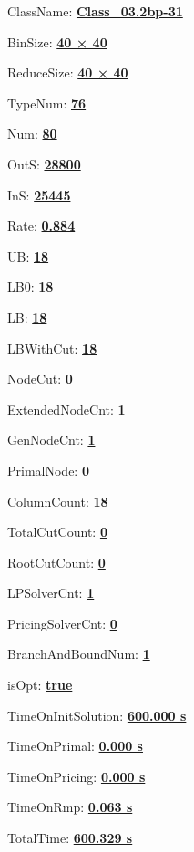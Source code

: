 \documentclass[11pt]{article}
\begin{document}
\pagestyle{empty}


ClassName: \underline{\textbf{Class_03.2bp-31}}
\par
BinSize: \underline{\textbf{40 × 40}}
\par
ReduceSize: \underline{\textbf{40 × 40}}
\par
TypeNum: \underline{\textbf{76}}
\par
Num: \underline{\textbf{80}}
\par
OutS: \underline{\textbf{28800}}
\par
InS: \underline{\textbf{25445}}
\par
Rate: \underline{\textbf{0.884}}
\par
UB: \underline{\textbf{18}}
\par
LB0: \underline{\textbf{18}}
\par
LB: \underline{\textbf{18}}
\par
LBWithCut: \underline{\textbf{18}}
\par
NodeCut: \underline{\textbf{0}}
\par
ExtendedNodeCnt: \underline{\textbf{1}}
\par
GenNodeCnt: \underline{\textbf{1}}
\par
PrimalNode: \underline{\textbf{0}}
\par
ColumnCount: \underline{\textbf{18}}
\par
TotalCutCount: \underline{\textbf{0}}
\par
RootCutCount: \underline{\textbf{0}}
\par
LPSolverCnt: \underline{\textbf{1}}
\par
PricingSolverCnt: \underline{\textbf{0}}
\par
BranchAndBoundNum: \underline{\textbf{1}}
\par
isOpt: \underline{\textbf{true}}
\par
TimeOnInitSolution: \underline{\textbf{600.000 s}}
\par
TimeOnPrimal: \underline{\textbf{0.000 s}}
\par
TimeOnPricing: \underline{\textbf{0.000 s}}
\par
TimeOnRmp: \underline{\textbf{0.063 s}}
\par
TotalTime: \underline{\textbf{600.329 s}}
\par
\newpage


\end{document}
